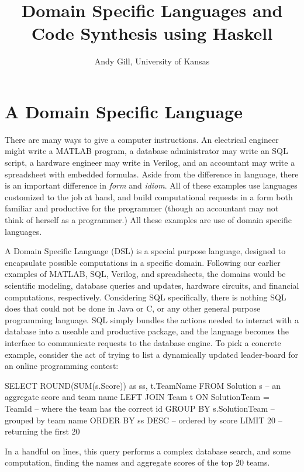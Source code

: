 \documentclass[11pt]{article}
\begin{document}
\title{Domain Specific Languages and Code Synthesis using Haskell}
\author{Andy Gill, University of Kansas}
\maketitle

\section{A Domain Specific Language}

There are many ways to give a computer instructions.
%
An electrical engineer might write a MATLAB program,
a database administrator may write an SQL script,
a hardware engineer may write in Verilog,
and an accountant may write a spreadsheet
with embedded formulas.
%
Aside from the difference in language, there is an
important difference in {\em form\/} and {\em idiom\/}.
%
All of these examples use languages
customized to the job at hand, and build computational
requests in a form both familiar and productive
for the programmer (though an accountant may
not think of herself as a programmer.)
All these examples are use of domain specific languages.

A Domain Specific Language (DSL) is a special purpose language,
designed to encapsulate possible computations in a specific
domain. Following our earlier examples of MATLAB, SQL,
Verilog, and spreadsheets, the domains would be scientific modeling,
database queries and updates, hardware circuits, and financial computations, respectively.
Considering SQL specifically, there is nothing SQL does that could not
be done in Java or C, or any other general purpose programming
language. SQL simply bundles the actions needed to
interact with a database into a useable and productive package,
and the language becomes the interface to communicate requests
to the database engine.
To pick a concrete example,
consider the act of trying to list a dynamically updated leader-board
for an online programming contest:
\begin{Code}
SELECT ROUND(SUM(s.Score)) as ss, t.TeamName FROM Solution s -- an aggregate score and team name
   LEFT JOIN Team t ON SolutionTeam = TeamId                 -- where the team has the correct id
   GROUP BY s.SolutionTeam                                   -- grouped by team name
   ORDER BY ss DESC                                          -- ordered by score
   LIMIT 20                                                  -- returning the first 20
\end{Code}
In a handful on lines, this query performs a complex
database search, and some computation, finding
the names and aggregate scores of the top 20 teams.
\end{document}
